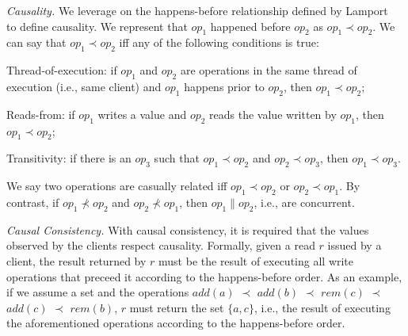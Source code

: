 \documentclass[sigconf, nonacm]{acmart}
\begin{document}
\emph{Causality.} 
We leverage on the happens-before relationship defined by Lamport~\cite{lamport78} to define causality.
We represent that $op_1$ happened before $op_2$ as $op_1 \prec op_2$.
We can say that $op_1 \prec op_2$ iff any of the following conditions is true:

\begin{compactitem}
	\item Thread-of-execution: if $op_1$ and $op_2$ are operations in the same thread of execution (i.e., same client) and $op_1$ happens prior to $op_2$, then $op_1 \prec op_2$;
	\item Reads-from: if $op_1$ writes a value and $op_2$ reads the value written by $op_1$, then $op_1 \prec op_2$;
	\item Transitivity: if there is an $op_3$ such that $op_1 \prec op_2$ and $op_2 \prec op_3$, then $op_1 \prec op_3$.
\end{compactitem} 

We say two operations are casually related iff $op_1 \prec op_2$ or $op_2 \prec op_1$.
By contrast, if $op_1 \nprec op_2$ and $op_2 \nprec op_1$, then $op_1 \parallel op_2$, i.e., are concurrent.

\emph{Causal Consistency.}
With causal consistency, it is required that the values observed by the clients respect causality.
Formally, given a read $r$ issued by a client, the result returned by $r$ must be the result of executing all write operations that preceed it according to the happens-before order.
As an example, if we assume a set and the operations $add(a)$ $\prec$ $add(b)$ $\prec$ $rem(c)$ $\prec$ $add(c)$ $\prec$ $rem(b)$, $r$ must return the set $\{a, c\}$, i.e., the result of executing the aforementioned operations according to the happens-before order.
\end{document}
